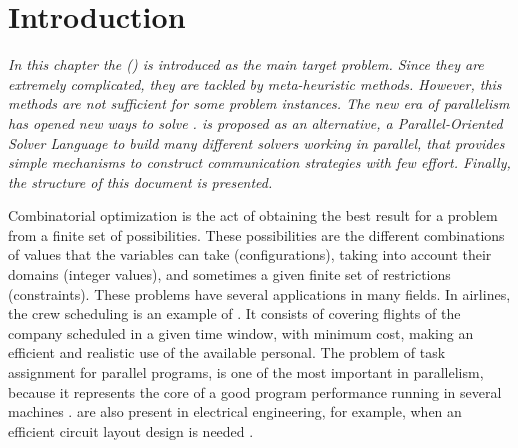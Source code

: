 \chapter{Introduction}
\label{chap:Intro}
\textit{In this chapter the \CSP{} (\csp) is introduced as the main target problem. Since they are extremely complicated, they are tackled by meta-heuristic methods. However, this methods are not sufficient for some problem instances. The new era of parallelism has opened new ways to solve \csps{}. \posl{} is proposed as an alternative, a Parallel-Oriented Solver Language to build many different solvers working in parallel, that provides simple mechanisms to construct communication strategies with few effort. Finally, the structure of this document is presented.}
\vfill
\minitoc
\newpage

Combinatorial optimization is the act of obtaining the best result for a problem from a finite set of possibilities. These possibilities are the different combinations of values that the variables can take (configurations), taking into account their domains (integer values), and sometimes a given finite set of restrictions (constraints). These problems have several applications in many fields. In airlines, the crew scheduling is an example of \COP. It consists of covering flights of the company scheduled in a given time window, with minimum cost, making an efficient and realistic use of the available personal. The problem of task assignment for parallel programs, is one of the most important in parallelism, because it represents the core of a good program performance running in several machines \cite{Paschos2013}. %
\COPs{} are also present in electrical engineering, for example, when an efficient circuit layout design is needed \cite{Barahona1988}. 

